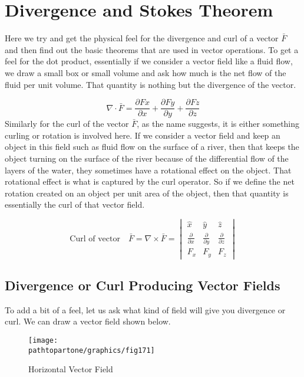 \section{Divergence and Stokes Theorem}\label{lec:lec17}
Here we try and get the physical feel for the divergence and curl of a vector $\bar{F}$  and then find out the basic theorems that are used in vector operations.
To get a feel for the dot product, essentially if we consider a vector field like a fluid flow, we draw a small box or small volume and ask how much is the net flow of the fluid per unit volume. That quantity is nothing but the divergence of the vector.

\begin{equation}
\nabla\cdot \bar{F} = \frac{\partial Fx}{\partial x} + \frac{\partial Fy}{\partial y} + \frac{\partial Fz}{\partial z}	
\end{equation}
Similarly for the curl of the vector $\bar{F}$, as the name suggests, it is either something curling or rotation is involved here. If we consider a vector field and keep an object in this field such as fluid flow on the surface of a river, then that keeps the object turning on the surface of the river because of the differential flow of the layers of the water, they sometimes have a rotational effect on the object. That rotational effect is what is captured by the curl operator. So if we define the net rotation created on an object per unit area of the object, then that quantity is essentially the curl of that vector field.

\begin{dmath}
\text{Curl of vector} \quad \bar{F} = \nabla \times \bar{F} = 
\begin{vmatrix}
\hat{x} & \hat{y} & \hat{z}\\
\frac{\partial}{\partial x} & \frac{\partial}{\partial y} & \frac{\partial}{\partial z}\\
F_{x} & F_{y} & F_{z}
\end{vmatrix}
\end{dmath}

\subsection{Divergence or Curl Producing Vector Fields}
To add a bit of a feel, let us ask what kind of field will give you divergence or curl. We can draw a vector field shown below.
\begin{figure}[h]
\centering
\texttt{[image: \\pathtopartone/graphics/fig171]}
\caption{Horizontal Vector Field}
\end{figure}

